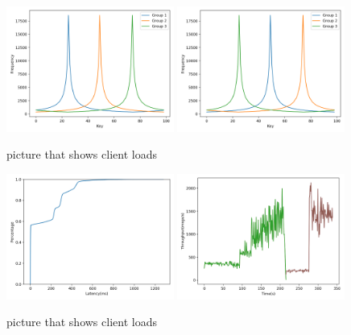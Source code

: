 \begin{figure}[!htb]
  \centering
  \includegraphics[width=0.49\textwidth,height=\textheight,keepaspectratio]{img/clients_loads.png}
  \includegraphics[width=0.49\textwidth,height=\textheight,keepaspectratio]{img/clients_loads_variable.png}
  \caption{ picture that shows client loads }
  \label{fig:variable-loads}
\end{figure}

\begin{figure}[!htb]
  \centering
  \includegraphics[width=0.49\textwidth,height=\textheight,keepaspectratio]{img/variable50_lat.png}
  \includegraphics[width=0.49\textwidth,height=\textheight,keepaspectratio]{img/variable50_tp.png}
  \caption{ picture that shows client loads }
  \label{fig:variable50-performance}
\end{figure}

